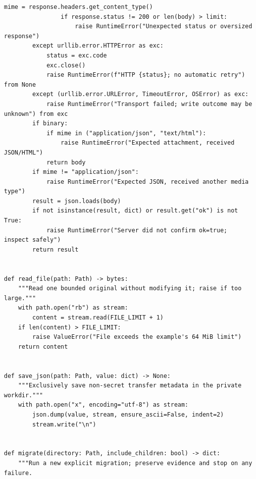 \documentclass[11pt,a4paper]{article}
\begin{document}
\begin{lstlisting}[language={}]
                mime = response.headers.get_content_type()
                if response.status != 200 or len(body) > limit:
                    raise RuntimeError("Unexpected status or oversized response")
        except urllib.error.HTTPError as exc:
            status = exc.code
            exc.close()
            raise RuntimeError(f"HTTP {status}; no automatic retry") from None
        except (urllib.error.URLError, TimeoutError, OSError) as exc:
            raise RuntimeError("Transport failed; write outcome may be unknown") from exc
        if binary:
            if mime in ("application/json", "text/html"):
                raise RuntimeError("Expected attachment, received JSON/HTML")
            return body
        if mime != "application/json":
            raise RuntimeError("Expected JSON, received another media type")
        result = json.loads(body)
        if not isinstance(result, dict) or result.get("ok") is not True:
            raise RuntimeError("Server did not confirm ok=true; inspect safely")
        return result


def read_file(path: Path) -> bytes:
    """Read one bounded original without modifying it; raise if too large."""
    with path.open("rb") as stream:
        content = stream.read(FILE_LIMIT + 1)
    if len(content) > FILE_LIMIT:
        raise ValueError("File exceeds the example's 64 MiB limit")
    return content


def save_json(path: Path, value: dict) -> None:
    """Exclusively save non-secret transfer metadata in the private workdir."""
    with path.open("x", encoding="utf-8") as stream:
        json.dump(value, stream, ensure_ascii=False, indent=2)
        stream.write("\n")


def migrate(directory: Path, include_children: bool) -> dict:
    """Run a new explicit migration; preserve evidence and stop on any failure.


\end{lstlisting}
\end{document}
